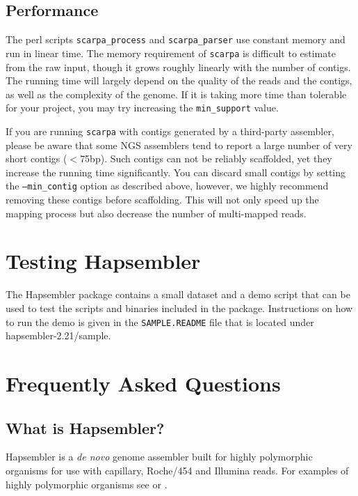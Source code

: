 \documentclass[12pt,a4paper]{report}
\newcommand{\hapversion}{2.21}
\begin{document}
\subsection{Performance}

The perl scripts \texttt{scarpa\_process} and \texttt{scarpa\_parser} use constant memory and run in linear time. The memory requirement of \texttt{scarpa} is difficult to estimate from the raw input, though it grows roughly linearly with the number of contigs. The running time will largely  depend on the quality of the reads and the contigs, as well as the complexity of the genome. If it is taking more time than tolerable for your project, you may try increasing the \texttt{min\_support} value.

If you are running \texttt{scarpa} with contigs generated by a third-party assembler, please be aware that some NGS assemblers tend to report a large number of very short contigs ($<$75bp). Such contigs can not be reliably scaffolded, yet they increase the running time significantly. You can discard small contigs by setting the \texttt{--min\_contig} option as described above, however, we highly recommend removing these contigs before scaffolding. This will not only speed up the mapping process but also decrease the number of multi-mapped reads. 

\section{Testing Hapsembler}

The Hapsembler package contains a small dataset and a demo script that can be used to test the scripts and binaries included in the package. Instructions on how to run the demo is given in the \texttt{SAMPLE.README} file that is located under hapsembler-\hapversion{}/sample.

\section{Frequently Asked Questions}
\label{faq}

\subsection{What is Hapsembler?}

Hapsembler\cite{donmez11} is a \emph{de novo} genome assembler built for highly polymorphic organisms for use with capillary, Roche/454 and Illumina reads. For examples of highly polymorphic organisms see \cite{small2} or \cite{sodergren}.
\end{document}
